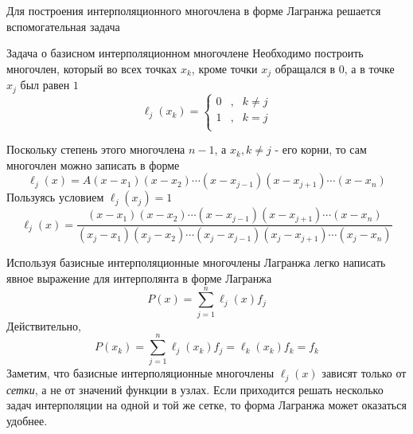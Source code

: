 \documentclass[professionalfonts,compress,unicode]{beamer}
\begin{document}
{
	Для построения интерполяционного многочлена в форме Лагранжа решается вспомогательная задача
	\begin{block}{Задача о базисном интерполяционном многочлене}
		Необходимо построить многочлен, который во всех точках $x_k$, кроме точки $x_j$ обращался в 0,
		а в точке $x_j$ был равен $1$
		$$
		\ell_j(x_k) = \left\{
		\begin{array}{lcl}
		0&,& k\neq j\\
		1&,& k = j\\
		\end{array}
		\right.
		$$
	\end{block}		
	\pause
	Поскольку степень этого многочлена $n-1$, а $x_k, k\neq j$ - его корни, то сам многочлен можно записать в форме
	$$
	\ell_j(x) = A(x-x_1)(x-x_2)\cdots(x-x_{j-1})(x-x_{j+1})\cdots(x-x_n)
	$$
	\pause
	Пользуясь условием $\ell_j(x_j) = 1$
	$$
	\ell_j(x) = \frac{(x-x_1)(x-x_2)\cdots(x-x_{j-1})(x-x_{j+1})\cdots(x-x_n)}{(x_j-x_1)(x_j-x_2)\cdots(x_j-x_{j-1})(x_j-x_{j+1})\cdots(x_j-x_n)}
	$$	
}

{
	Используя базисные интерполяционные многочлены Лагранжа легко написать явное выражение для интерполянта в форме Лагранжа
	$$
	P(x) = \sum_{j=1}^n \ell_j(x) f_j
	$$
	\pause
	Действительно,
	$$
	P(x_k) = \sum_{j=1}^n \ell_j(x_k) f_j = \ell_k(x_k) f_k = f_k
	$$
	\pause
	Заметим, что базисные интерполяционные многочлены $\ell_j(x)$ зависят только от \emph{сетки}, а не от значений 
	функции в узлах. Если приходится решать несколько задач интерполяции на одной и той же сетке, 
	то форма Лагранжа может оказаться удобнее.
}
\end{document}
